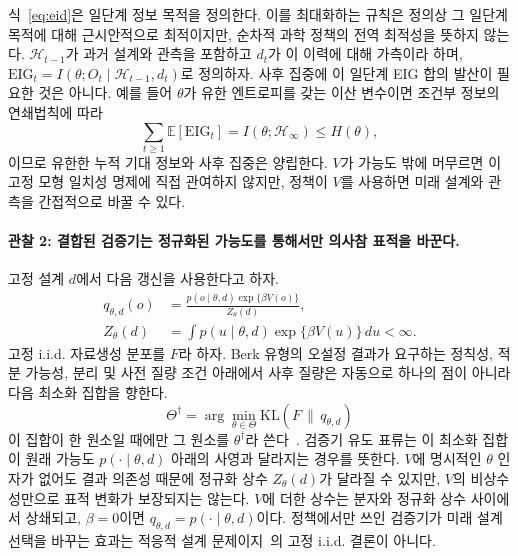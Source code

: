 \documentclass[11pt]{article}
\begin{document}
식~\ref{eq:eid}은 일단계 정보 목적을 정의한다. 이를 최대화하는 규칙은 정의상 그 일단계 목적에 대해 근시안적으로 최적이지만, 순차적 과학 정책의 전역 최적성을 뜻하지 않는다. $\mathcal H_{t-1}$가 과거 설계와 관측을 포함하고 $d_t$가 이 이력에 대해 가측이라 하며, $\mathrm{EIG}_t=I(\theta;O_t\mid\mathcal H_{t-1},d_t)$로 정의하자. 사후 집중에 이 일단계 EIG 합의 발산이 필요한 것은 아니다. 예를 들어 $\theta$가 유한 엔트로피를 갖는 이산 변수이면 조건부 정보의 연쇄법칙에 따라
\begin{equation}
  \sum_{t\geq 1}\mathbb{E}\!\left[\mathrm{EIG}_t\right]
  = I(\theta;\mathcal H_\infty) \leq H(\theta),
\end{equation}
이므로 유한한 누적 기대 정보와 사후 집중은 양립한다. $V$가 가능도 밖에 머무르면 이 고정 모형 일치성 명제에 직접 관여하지 않지만, 정책이 $V$를 사용하면 미래 설계와 관측을 간접적으로 바꿀 수 있다.

\paragraph{관찰 2: 결합된 검증기는 정규화된 가능도를 통해서만 의사참 표적을 바꾼다.}
고정 설계 $d$에서 다음 갱신을 사용한다고 하자.
\begin{equation}
  \begin{aligned}
    q_{\theta,d}(o)
      &= \frac{p(o\mid\theta,d)\exp\{\beta V(o)\}}{Z_\theta(d)}, \\
    Z_\theta(d)
      &= \int p(u\mid\theta,d)\exp\{\beta V(u)\}\,du < \infty.
  \end{aligned}
\end{equation}
고정 i.i.d. 자료생성 분포를 $F$라 하자. Berk 유형의 오설정 결과가 요구하는 정칙성, 적분 가능성, 분리 및 사전 질량 조건 아래에서 사후 질량은 자동으로 하나의 점이 아니라 다음 최소화 집합을 향한다.
\begin{equation}
  \Theta^\dagger
  = \arg\min_{\theta\in\Theta}\mathrm{KL}\!\left(F\,\|\,q_{\theta,d}\right)
\end{equation}
이 집합이 한 원소일 때에만 그 원소를 $\theta^\dagger$라 쓴다~\citep{berk1966}. 검증기 유도 표류는 이 최소화 집합이 원래 가능도 $p(\cdot\mid\theta,d)$ 아래의 사영과 달라지는 경우를 뜻한다. $V$에 명시적인 $\theta$ 인자가 없어도 결과 의존성 때문에 정규화 상수 $Z_\theta(d)$가 달라질 수 있지만, $V$의 비상수성만으로 표적 변화가 보장되지는 않는다. $V$에 더한 상수는 분자와 정규화 상수 사이에서 상쇄되고, $\beta=0$이면 $q_{\theta,d}=p(\cdot\mid\theta,d)$이다. 정책에서만 쓰인 검증기가 미래 설계 선택을 바꾸는 효과는 적응적 설계 문제이지~\citet{berk1966}의 고정 i.i.d. 결론이 아니다.
\end{document}
